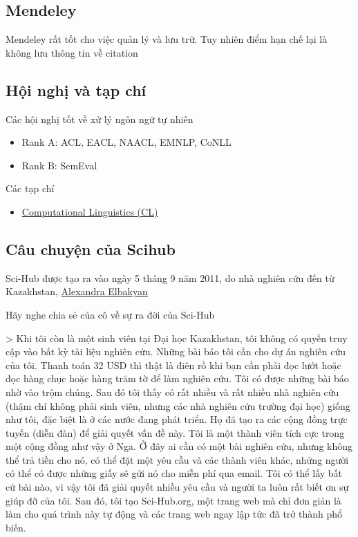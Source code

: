 \subsection{Mendeley}

Mendeley rất tốt cho việc quản lý và lưu trữ. Tuy nhiên điểm hạn chế lại là không lưu thông tin về citation

\subsection{Hội nghị và tạp chí}

Các hội nghị tốt về xử lý ngôn ngữ tự nhiên

\begin{itemize}
  \item Rank A: ACL, EACL, NAACL, EMNLP, CoNLL
  \item Rank B: SemEval
\end{itemize}

Các tạp chí

\begin{itemize}
  \item \href{http://www.mitpressjournals.org/loi/coli}{Computational Linguistics (CL)}
\end{itemize}

\subsection{Câu chuyện của Scihub}

Sci-Hub được tạo ra vào ngày 5 tháng 9 năm 2011, do nhà nghiên cứu đến từ Kazakhstan, \href{https://en.wikipedia.org/wiki/Alexandra_Elbakyan}{Alexandra Elbakyan}

Hãy nghe chia sẻ của cô về sự ra đời của Sci-Hub

> Khi tôi còn là một sinh viên tại Đại học Kazakhstan, tôi không có quyền truy cập vào bất kỳ tài liệu nghiên cứu. Những bài báo tôi cần cho dự án nghiên cứu của tôi. Thanh toán 32 USD thì thật là điên rồ khi bạn cần phải đọc lướt hoặc đọc hàng chục hoặc hàng trăm tờ để làm nghiên cứu. Tôi có được những bài báo nhờ vào trộm chúng. Sau đó tôi thấy có rất nhiều và rất nhiều nhà nghiên cứu (thậm chí không phải sinh viên, nhưng các nhà nghiên cứu trường đại học) giống như tôi, đặc biệt là ở các nước đang phát triển. Họ đã tạo ra các cộng đồng trực tuyến (diễn đàn) để giải quyết vấn đề này. Tôi là một thành viên tích cực trong một cộng đồng như vậy ở Nga. Ở đây ai cần có một bài nghiên cứu, nhưng không thể trả tiền cho nó, có thể đặt một yêu cầu và các thành viên khác, những người có thể có được những giấy sẽ gửi nó cho miễn phí qua email. Tôi có thể lấy bất cứ bài nào, vì vậy tôi đã giải quyết nhiều yêu cầu và người ta luôn rất biết ơn sự giúp đỡ của tôi. Sau đó, tôi tạo Sci-Hub.org, một trang web mà chỉ đơn giản là làm cho quá trình này tự động và các trang web ngay lập tức đã trở thành phổ biến.

